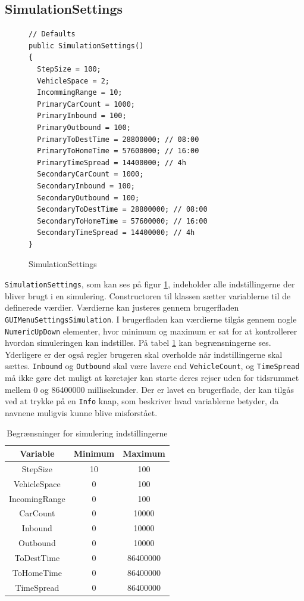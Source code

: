 \subsection{SimulationSettings}
\begin{figure}[H]
\begin{lstlisting} 
// Defaults
public SimulationSettings()
{
  StepSize = 100;
  VehicleSpace = 2;
  IncommingRange = 10;
  PrimaryCarCount = 1000;
  PrimaryInbound = 100;
  PrimaryOutbound = 100;
  PrimaryToDestTime = 28800000; // 08:00
  PrimaryToHomeTime = 57600000; // 16:00
  PrimaryTimeSpread = 14400000; // 4h
  SecondaryCarCount = 1000;
  SecondaryInbound = 100;
  SecondaryOutbound = 100;
  SecondaryToDestTime = 28800000; // 08:00
  SecondaryToHomeTime = 57600000; // 16:00
  SecondaryTimeSpread = 14400000; // 4h
}
\end{lstlisting}
\caption{SimulationSettings}\label{SimulationSettings}
\end{figure}

\texttt{SimulationSettings}, som kan ses på figur \ref{SimulationSettings}, indeholder alle indstillingerne der bliver brugt i en simulering. Constructoren til klassen sætter variablerne til de definerede værdier. Værdierne kan justeres gennem brugerfladen \texttt{GUIMenuSettingsSimulation}. I brugerfladen kan værdierne tilgås gennem nogle \texttt{NumericUpDown} elementer, hvor minimum og maximum er sat for at kontrollerer hvordan simuleringen kan indstilles. På tabel \ref{SimulationLimits} kan begrænsningerne ses. Yderligere er der også regler brugeren skal overholde når indstillingerne skal sættes. \texttt{Inbound} og \texttt{Outbound} skal være lavere end \texttt{VehicleCount}, og \texttt{TimeSpread} må ikke gøre det muligt at køretøjer kan starte deres rejser uden for tidsrummet mellem 0 og 86400000 millisekunder. Der er lavet en brugerflade, der kan tilgås ved at trykke på en \texttt{Info} knap, som beskriver hvad variablerne betyder, da navnene muligvis kunne blive misforstået.

\begin{table}[]
\centering
\begin{tabular}{| c | c | c |}
  \hline
Variable & Minimum & Maximum \\
  \hline
StepSize & 10 & 100 \\
  \hline
VehicleSpace & 0 & 100 \\
  \hline
IncomingRange & 0 & 100 \\
  \hline
CarCount & 0 & 10000 \\
  \hline
Inbound & 0 & 10000 \\
  \hline
Outbound & 0 & 10000 \\
  \hline
ToDestTime & 0 & 86400000 \\
  \hline
ToHomeTime & 0 & 86400000 \\
  \hline
TimeSpread & 0 & 86400000 \\
  \hline
\end{tabular}
\caption{Begrænsninger for simulering indstillingerne}\label{SimulationLimits}
\end{table}

